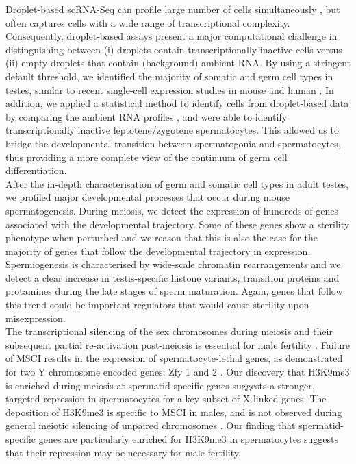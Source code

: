 Droplet-based scRNA-Seq can profile large number of cells simultaneously \citep{Klein2015, Macosko2015, Zheng2017}, but often captures cells with a wide range of transcriptional complexity. 
Consequently, droplet-based assays present a major computational challenge in distinguishing between (i) droplets contain transcriptionally inactive cells versus (ii) empty droplets that contain (background) ambient RNA. 
By using a stringent default threshold, we identified the majority of somatic and germ cell types in testes, similar to recent single-cell expression studies in mouse and human \citep{Lukassen2018, Xia2018, Chen2018}. 
In addition, we applied a statistical method to identify cells from droplet-based data by comparing the ambient RNA profiles \citep{Lun2018}, and were able to identify transcriptionally inactive leptotene/zygotene spermatocytes. 
This allowed us to bridge the developmental transition between spermatogonia and spermatocytes, thus providing a more complete view of the continuum of germ cell differentiation.\\

After the in-depth characterisation of germ and somatic cell types in adult testes, we profiled major developmental processes that occur during mouse spermatogenesis. 
During meiosis, we detect the expression of hundreds of genes associated with the developmental trajectory. 
Some of these genes show a sterility phenotype when perturbed and we reason that this is also the case for the majority of genes that follow the developmental trajectory in expression. 
Spermiogenesis is characterised by wide-scale chromatin rearrangements and we detect a clear increase in testis-specific histone variants, transition proteins and protamines during the late stages of sperm maturation. 
Again, genes that follow this trend could be important regulators that would cause sterility upon misexpression.   \\

The transcriptional silencing of the sex chromosomes during meiosis and their subsequent partial re-activation post-meiosis is essential for male fertility \citep{Mahadevaiah2008}. 
Failure of \gls{MSCI} results in the expression of spermatocyte-lethal genes, as demonstrated for two Y chromosome encoded genes: \gls{Zfy} 1 and 2 \citep{Royo2010}. 
Our discovery that H3K9me3 is enriched during meiosis at spermatid-specific genes suggests a stronger, targeted repression in spermatocytes for a key subset of X-linked genes. 
The deposition of H3K9me3 is specific to MSCI in males, and is not observed during general meiotic silencing of unpaired chromosomes \citep{Cloutier2016, Taketo2013, Turner2004a}. 
Our finding that spermatid-specific genes are particularly enriched for H3K9me3 in spermatocytes suggests that their repression may be necessary for male fertility. \\

